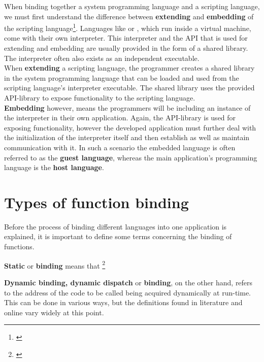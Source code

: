 When binding together a system programming language and a scripting language, we must first understand the difference between \textbf{extending} and \textbf{embedding} of the scripting language\footnote{\citep{PythonHP}}. Languages like  or , which run inside a virtual machine, come with their own interpreter. This interpreter and the API that is used for extending and embedding are usually provided in the form of a shared library. The interpreter often also exists as an independent executable. \\
When \textbf{extending} a scripting language, the programmer creates a shared library in the system programming language that can be loaded and used from the scripting language's interpreter executable. The shared library uses the provided API-library to expose functionality to the scripting language.\\
\textbf{Embedding} however, means the programmers will be including an instance of the interpreter in their own application. Again, the API-library is used for exposing functionality, however the developed application must further deal with the initialization of the interpreter itself and then establish as well as maintain communication with it. In such a scenario the embedded language is often referred to as the \textbf{guest language}, whereas the main application's programming language is the \textbf{host language}.

\section{Types of function binding}
\label{sec:TypesOfFunctionBinding}

Before the process of binding different languages into one application is explained, it is important to define some terms concerning the binding of functions.

\textbf{Static} or \textbf{ binding} means that \footnote{\citep[41]{ThinkingInCPP}}

\textbf{Dynamic binding, dynamic dispatch} or \textbf{ binding}, on the other hand, refers to the address of the code to be called being acquired dynamically at run-time. This can be done in various ways, but the definitions found in literature and online vary widely at this point.

